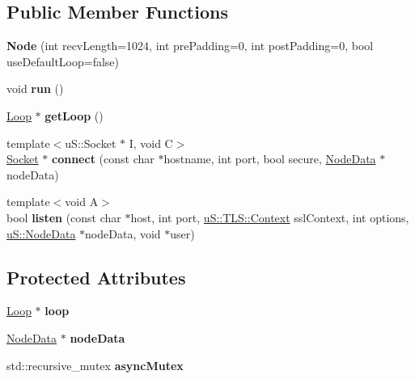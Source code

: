 \subsection*{Public Member Functions}
\begin{DoxyCompactItemize}
\item 
\mbox{\label{classu_s_1_1_node_a974a8ae656b79e60e49c6f5e4a8da30f}} 
{\bfseries Node} (int recv\+Length=1024, int pre\+Padding=0, int post\+Padding=0, bool use\+Default\+Loop=false)
\item 
\mbox{\label{classu_s_1_1_node_a06830f1b69a628f897d34b1455768c67}} 
void {\bfseries run} ()
\item 
\mbox{\label{classu_s_1_1_node_a7d4bf86bb320e3e9d04ca8bc88934387}} 
\mbox{\hyperlink{struct_loop}{Loop}} $\ast$ {\bfseries get\+Loop} ()
\item 
\mbox{\label{classu_s_1_1_node_a45614cbc70d9121b48738728f559cf4e}} 
{\footnotesize template$<$u\+S\+::\+Socket $\ast$ I, void  C$>$ }\\\mbox{\hyperlink{structu_s_1_1_socket}{Socket}} $\ast$ {\bfseries connect} (const char $\ast$hostname, int port, bool secure, \mbox{\hyperlink{structu_s_1_1_node_data}{Node\+Data}} $\ast$node\+Data)
\item 
\mbox{\label{classu_s_1_1_node_a34fd54fc00bf444b9732265a0cf16651}} 
{\footnotesize template$<$void  A$>$ }\\bool {\bfseries listen} (const char $\ast$host, int port, \mbox{\hyperlink{classu_s_1_1_t_l_s_1_1_context}{u\+S\+::\+T\+L\+S\+::\+Context}} ssl\+Context, int options, \mbox{\hyperlink{structu_s_1_1_node_data}{u\+S\+::\+Node\+Data}} $\ast$node\+Data, void $\ast$user)
\end{DoxyCompactItemize}
\subsection*{Protected Attributes}
\begin{DoxyCompactItemize}
\item 
\mbox{\label{classu_s_1_1_node_a6ed3621e46f3d9906f547379acb6869d}} 
\mbox{\hyperlink{struct_loop}{Loop}} $\ast$ {\bfseries loop}
\item 
\mbox{\label{classu_s_1_1_node_a9a460187fa7f25b65f21d16eeea8e7da}} 
\mbox{\hyperlink{structu_s_1_1_node_data}{Node\+Data}} $\ast$ {\bfseries node\+Data}
\item 
\mbox{\label{classu_s_1_1_node_a952e66eabb6bc34299cc7804646ee019}} 
std\+::recursive\+\_\+mutex {\bfseries async\+Mutex}
\end{DoxyCompactItemize}


